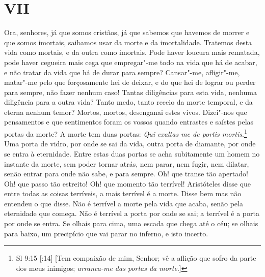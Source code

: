 \section*{VII}

Ora, senhores, já que somos cristãos, já que sabemos que havemos de
morrer e que somos imortais, saibamos usar da morte e da imortalidade.
Tratemos desta vida como mortais, e da outra como imortais. Pode haver
loucura mais rematada, pode haver cegueira mais cega que empregar"-me
todo na vida que há de acabar, e não tratar da vida que há de durar para
sempre? Cansar"-me, afligir"-me, matar"-me pelo que forçosamente hei de
deixar, e do que hei de lograr ou perder para sempre, não fazer nenhum
caso! Tantas diligências para esta vida, nenhuma diligência para a outra
vida? Tanto medo, tanto receio da morte temporal, e da eterna nenhum
temor? Mortos, mortos, desenganai estes vivos. Dizei"-nos que pensamentos
e que sentimentos foram os vossos quando entrastes e saístes pelas
portas da morte? A morte tem duas portas: \emph{Qui exaltas me de portis
mortis}.\footnote{Sl 9:15 [:14] [Tem compaixão de mim, Senhor; vê a aflição que sofro da parte dos meus inimigos; \emph{arranca-me das portas da morte}.]} Uma porta de vidro, por onde se sai da vida, outra porta de
diamante, por onde se entra à eternidade. Entre estas duas portas se
acha subitamente um homem no instante da morte, sem poder tornar atrás,
nem parar, nem fugir, nem dilatar, senão entrar para onde não sabe, e
para sempre. Oh! que transe tão apertado! Oh! que passo tão estreito!
Oh! que momento tão terrível! Aristóteles disse que entre todas as
coisas terríveis, a mais terrível é
a morte. Disse bem mas não entendeu o que disse. Não é terrível a morte
pela vida que acaba, senão pela eternidade que começa. Não é terrível a
porta por onde se sai; a terrível é a porta por onde se entra. Se olhais
para cima, uma escada que chega até o céu; se olhais para baixo, um
precipício que vai parar no inferno, e isto incerto.

